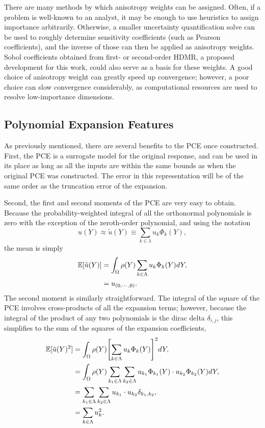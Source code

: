 There are many methods by which anisotropy weights can be assigned.  Often, if a problem is well-known to an 
analyst, it may be enough to use heuristics to assign importance arbitrarily.  Otherwise, a smaller
uncertainty quantification solve can be used to roughly determine sensitivity coefficients (such as Pearson
coefficients), and the inverse of those can then be applied as anisotropy weights.  Sobol coefficients
obtained from first- or second-order HDMR, a proposed development for this work, could also serve as a basis for these weights.
A good choice of anisotropy weight can greatly speed up convergence; however, a
poor choice can slow convergence considerably, as computational resources are used to resolve low-importance
dimensions.


\subsection{Polynomial Expansion Features}
As previously mentioned, there are several benefits to the PCE once constructed.  First, the PCE is a
surrogate model for the original response, and can be used in its place as long as all the inputs are within
the same bounds as when the original PCE was constructed.  The error in this representation will be of the
same order as the truncation error of the expansion.

Second, the first and second moments of the PCE are very easy to obtain.  Because the probability-weighted 
integral of all the orthonormal polynomials is zero with the exception of the zeroth-order polynomial, and
using the notation 
\begin{equation}
  u(Y) \approx \tilde u(Y) \equiv \sum_{k\in\lambda} u_k\Phi_k(Y),
\end{equation}
the mean is simply
\begin{align}
  \mathbb{E}[ \tilde u(Y)]  &= \int_\Omega \rho(Y) \sum_{k\in\Lambda} u_k\Phi_k(Y) dY, \nonumber\\
                      &= u_{(0,\cdots,0)}.
\end{align}
The second moment is similarly straightforward.  The integral of the square of the PCE involves cross-products of
all the expansion terms; however, because the integral of the product of any two polynomials is the dirac
delta $\delta_{i,j}$, this simplifies to the sum of the squares of the expansion coefficients,
\begin{align}
  \expv{\tilde u(Y)^2} &=\int_\Omega \rho(Y) \qty[\sum_{k\in\Lambda} u_k\Phi_k(Y)]^2 dY,
                 \nonumber\\ \vspace{5pt}
  &= \int_\Omega \rho(Y) \sum_{k_1\in\Lambda} \sum_{k_2\in\Lambda} u_{k_1}\Phi_{k_1}(Y) \cdot 
                           u_{k_2}\Phi_{k_2}(Y) dY, \nonumber \\ \vspace{5pt}
  &= \sum_{k_1\in\Lambda} \sum_{k_2\in\Lambda} u_{k_1} \cdot u_{k_2}\delta_{k_1,k_2},\nonumber \\ \vspace{5pt}
  &= \sum_{k\in\Lambda} u_k^2.
\end{align}

